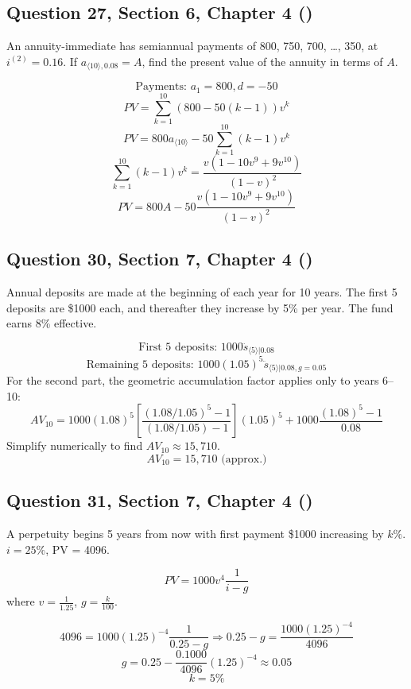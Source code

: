 \documentclass[12pt, a4paper]{article}
\newcommand{\angl}[1]{\langle #1 \rangle}
\begin{document}
\subsection*{Question 27, Section 6, Chapter 4  (\cite{toi3rd})}

\noindent An annuity-immediate has semiannual payments of 800, 750, 700, \dots, 350, at \( i^{(2)} = 0.16. \)  
If \( a_{\angl{10}, 0.08} = A \), find the present value of the annuity in terms of \( A. \)

\[
\text{Payments: } a_1 = 800, d = -50
\]
\[
PV = \sum_{k=1}^{10} (800 - 50(k-1))v^k
\]
\[
PV = 800 a_{\angl{10}} - 50 \sum_{k=1}^{10}(k-1)v^k
\]
\[
\sum_{k=1}^{10}(k-1)v^k = \frac{v(1 - 10v^9 + 9v^{10})}{(1 - v)^2}
\]
\[
\boxed{PV = 800A - 50 \frac{v(1 - 10v^9 + 9v^{10})}{(1 - v)^2}}
\]

\subsection*{Question 30, Section 7, Chapter 4  (\cite{toi3rd})}

Annual deposits are made at the beginning of each year for 10 years.  
The first 5 deposits are \$1000 each, and thereafter they increase by 5\% per year.  
The fund earns 8\% effective.

\[
\text{First 5 deposits: } 1000 \ddot{s}_{\angl{5}|0.08}
\]
\[
\text{Remaining 5 deposits: } 1000(1.05)^5 \ddot{s}_{\angl{5}|0.08, g=0.05}
\]
For the second part, the geometric accumulation factor applies only to years 6–10:
\[
AV_{10} = 1000(1.08)^5 \left[\frac{(1.08/1.05)^5 - 1}{(1.08/1.05) - 1}\right] (1.05)^5 + 1000 \frac{(1.08)^5 - 1}{0.08}
\]
Simplify numerically to find \( AV_{10} \approx 15{,}710 \).
\[
\boxed{AV_{10} = 15{,}710 \text{ (approx.)}}
\]

\subsection*{Question 31, Section 7, Chapter 4  (\cite{toi3rd})}

A perpetuity begins 5 years from now with first payment \$1000 increasing by \(k\%\).  
\(i = 25\%\), PV = 4096.

\[
PV = 1000 v^4 \frac{1}{i - g}
\]
where \(v = \frac{1}{1.25}\), \(g = \frac{k}{100}\).

\[
4096 = 1000 (1.25)^{-4} \frac{1}{0.25 - g}
\Rightarrow 0.25 - g = \frac{1000 (1.25)^{-4}}{4096}
\]
\[
g = 0.25 - \frac{0.1000}{4096} (1.25)^{-4} \approx 0.05
\]
\[
\boxed{k = 5\%}
\]
\end{document}
